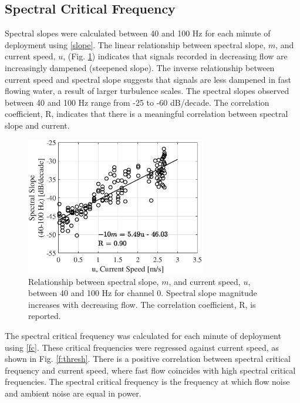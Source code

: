 \documentclass[12pt,journal,onecolumn]{IEEEtran}
\begin{document}
\subsection{Spectral Critical Frequency}
Spectral slopes were calculated between 40 and 100 Hz for each minute of deployment using \eqref{slope}. The linear relationship between spectral slope, $m$, and current speed, $u$, (Fig. \ref{f:slopes}) indicates that signals recorded in decreasing flow are increasingly dampened (steepened slope). The inverse relationship between current speed and spectral slope suggests that signals are less dampened in fast flowing water, a result of larger turbulence scales. The spectral slopes observed between 40 and 100 Hz range from -25 to -60 dB/decade. The correlation coefficient, R, indicates that there is a meaningful correlation between spectral slope and current.
\begin{figure}[!t]
	\begin{center}
		\includegraphics[width=0.7\textwidth]{figure3.eps} 
	\end{center}%
	\caption[Spectral slope current speed dependence]{
	\label{f:slopes}
	Relationship between spectral slope, $m$, and current speed, $u$, between 40 and 100 Hz for channel 0. Spectral slope magnitude increases with decreasing flow. The correlation coefficient, R, is reported. }
\end{figure}


The spectral critical frequency was calculated for each minute of deployment using \eqref{fc}. These critical frequencies were regressed against current speed, as shown in Fig. \ref{f:thresh}. There is a positive correlation between spectral critical frequency and current speed, where fast flow coincides with high spectral critical frequencies. The spectral critical frequency is the frequency at which flow noise and ambient noise are equal in power. 
\end{document}
